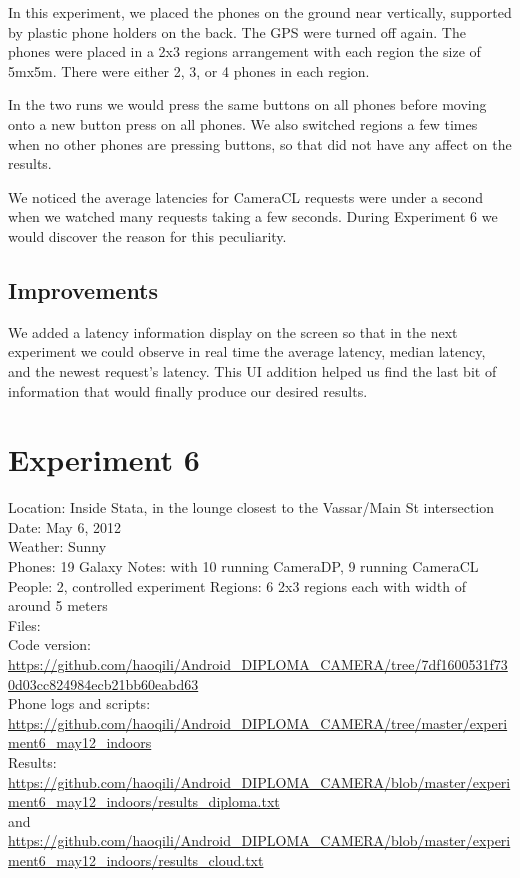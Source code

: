 In this experiment, we placed the phones on the ground near vertically, supported by plastic phone holders on the back. The GPS were turned off again.  The phones were placed in a 2x3 regions arrangement with each region the size of 5mx5m. There were either 2, 3, or 4 phones in each region.

In the two runs we would press the same buttons on all phones before moving onto a new button press on all phones. We also switched regions a few times when no other phones are pressing buttons, so that did not have any affect on the results.

We noticed the average latencies for CameraCL requests were under a second when we watched many requests taking a few seconds. During Experiment 6 we would discover the reason for this peculiarity.

\subsection{Improvements}

We added a latency information display on the screen so that in the next experiment we could observe in real time the average latency, median latency, and the newest request's latency. This UI addition helped us find the last bit of information that would finally produce our desired results.

\section{Experiment 6}

Location: Inside Stata, in the lounge closest to the Vassar/Main St intersection\\
Date: May 6, 2012\\
Weather: Sunny\\
Phones: 19 Galaxy Notes: with 10 running CameraDP, 9 running CameraCL\\
People: 2, controlled experiment
Regions: 6 2x3 regions each with width of around 5 meters\\
Files:\\
Code version: {\url{https://github.com/haoqili/Android_DIPLOMA_CAMERA/tree/7df1600531f730d03cc824984ecb21bb60eabd63}}\\
Phone logs and scripts: {\url{https://github.com/haoqili/Android_DIPLOMA_CAMERA/tree/master/experiment6_may12_indoors}}\\ 
Results: {\url{https://github.com/haoqili/Android_DIPLOMA_CAMERA/blob/master/experiment6_may12_indoors/results_diploma.txt}}\\
and {\url{https://github.com/haoqili/Android_DIPLOMA_CAMERA/blob/master/experiment6_may12_indoors/results_cloud.txt}}

